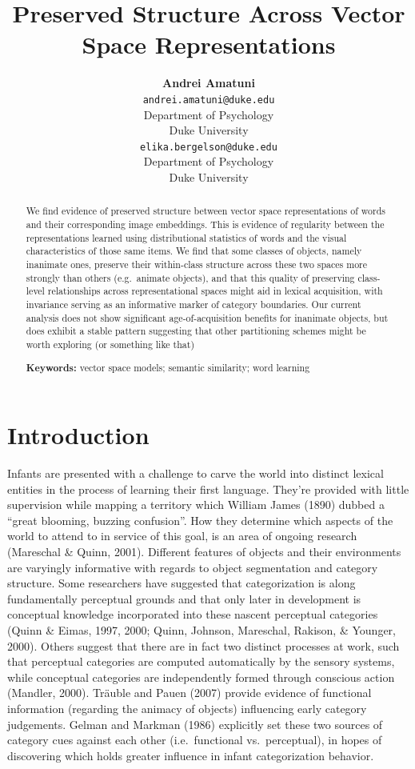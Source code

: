 \documentclass[10pt, letterpaper]{article}
\title{Preserved Structure Across Vector Space Representations}
\author{{\large \bf Andrei Amatuni} \\ \texttt{andrei.amatuni@duke.edu} \\ Department of Psychology \\ Duke University \And {\large \bf Elika Bergelson} \\ \texttt{elika.bergelson@duke.edu} \\ Department of Psychology \\ Duke University}
\begin{document}
\maketitle

\begin{abstract}
We find evidence of preserved structure between vector space
representations of words and their corresponding image embeddings. This
is evidence of regularity between the representations learned using
distributional statistics of words and the visual characteristics of
those same items. We find that some classes of objects, namely inanimate
ones, preserve their within-class structure across these two spaces more
strongly than others (e.g.~animate objects), and that this quality of
preserving class-level relationships across representational spaces
might aid in lexical acquisition, with invariance serving as an
informative marker of category boundaries. Our current analysis does not
show significant age-of-acquisition benefits for inanimate objects, but
does exhibit a stable pattern suggesting that other partitioning schemes
might be worth exploring (or something like that)

\textbf{Keywords:}
vector space models; semantic similarity; word learning
\end{abstract}

\section{Introduction}\label{introduction}

Infants are presented with a challenge to carve the world into distinct
lexical entities in the process of learning their first language.
They're provided with little supervision while mapping a territory which
William James (1890) dubbed a ``great blooming, buzzing confusion''. How
they determine which aspects of the world to attend to in service of
this goal, is an area of ongoing research (Mareschal \& Quinn, 2001).
Different features of objects and their environments are varyingly
informative with regards to object segmentation and category structure.
Some researchers have suggested that categorization is along
fundamentally perceptual grounds and that only later in development is
conceptual knowledge incorporated into these nascent perceptual
categories (Quinn \& Eimas, 1997, 2000; Quinn, Johnson, Mareschal,
Rakison, \& Younger, 2000). Others suggest that there are in fact two
distinct processes at work, such that perceptual categories are computed
automatically by the sensory systems, while conceptual categories are
independently formed through conscious action (Mandler, 2000). Träuble
and Pauen (2007) provide evidence of functional information (regarding
the animacy of objects) influencing early category judgements. Gelman
and Markman (1986) explicitly set these two sources of category cues
against each other (i.e.~functional vs.~perceptual), in hopes of
discovering which holds greater influence in infant categorization
behavior.
\end{document}
